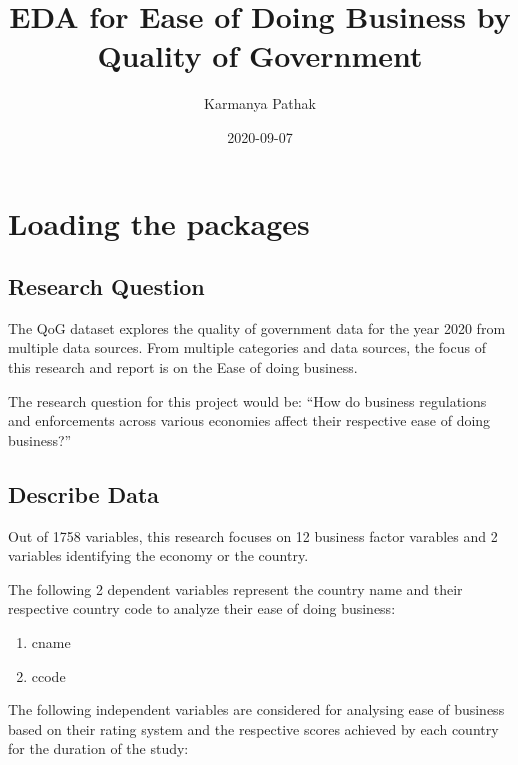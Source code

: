 \documentclass[
]{article}
\title{EDA for Ease of Doing Business by Quality of Government}
\author{Karmanya Pathak}
\date{2020-09-07}
\begin{document}
\maketitle

\hypertarget{loading-the-packages}{%
\section{Loading the packages}\label{loading-the-packages}}

\hypertarget{research-question}{%
\subsection{Research Question}\label{research-question}}

The QoG dataset explores the quality of government data for the year
2020 from multiple data sources. From multiple categories and data
sources, the focus of this research and report is on the Ease of doing
business.

The research question for this project would be: ``How do business
regulations and enforcements across various economies affect their
respective ease of doing business?''

\hypertarget{describe-data}{%
\subsection{Describe Data}\label{describe-data}}

Out of 1758 variables, this research focuses on 12 business factor
varables and 2 variables identifying the economy or the country.

The following 2 dependent variables represent the country name and their
respective country code to analyze their ease of doing business:

\begin{enumerate}
\def\labelenumi{\arabic{enumi}.}
\item
  cname
\item
  ccode
\end{enumerate}

The following independent variables are considered for analysing ease of
business based on their rating system and the respective scores achieved
by each country for the duration of the study:
\end{document}
